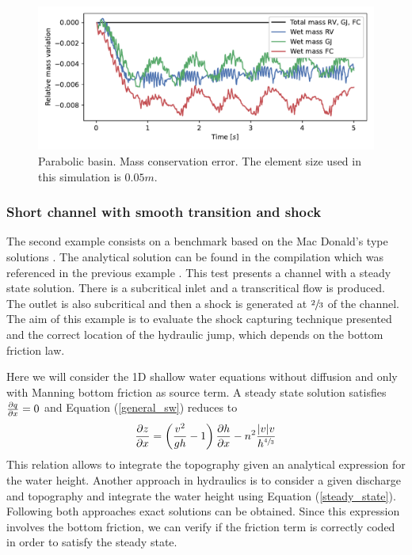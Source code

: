 \begin{figure}[H]
    \centering
    \includegraphics[width=.95\textwidth]{img/eulerian/par/mass_conservation}
    \caption{Parabolic basin. Mass conservation error. The element size used in this simulation is $0.05m$.}
    \label{parabola_mass}
\end{figure}





\subsubsection{Short channel with smooth transition and shock}


The second example consists on a benchmark based on the Mac Donald's type solutions \cite{macdonald1997}. The analytical solution can be found in the compilation which was referenced in the previous example \cite{delestre2013}. This test presents a channel with a steady state solution. There is a subcritical inlet and a transcritical flow is produced. The outlet is also subcritical and then a shock is generated at $\sfrac{2}{3}$ of the channel. The aim of this example is to evaluate the shock capturing technique presented and the correct location of the hydraulic jump, which depends on the bottom friction law.

Here we will consider the 1D shallow water equations without diffusion and only with Manning bottom friction as source term. A steady state solution satisfies $\frac{\partial q}{\partial x}=0$ and Equation (\ref{general_sw}) reduces to
\begin{equation} \label{steady_state}
\frac{\partial z}{\partial x} = \left(\frac{v^2}{gh}-1\right) \frac{\partial h}{\partial x} - n^2\frac{\lvert v\rvert v}{h^{\sfrac{4}{3}}}
\end{equation}
This relation allows to integrate the topography given an analytical expression for the water height. Another approach in hydraulics is to consider a given discharge and topography and integrate the water height using Equation (\ref{steady_state}). Following both approaches exact solutions can be obtained. Since this expression involves the bottom friction, we can verify if the friction term is correctly coded in order to satisfy the steady state.

